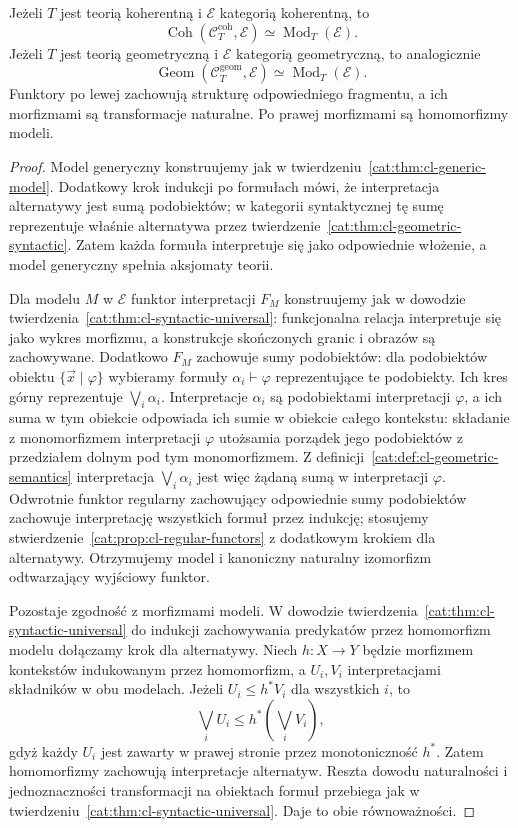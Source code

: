 \begin{twierdzenie}\label{cat:thm:cl-geometric-syntactic-universal}
Jeżeli $T$ jest teorią koherentną i $\mathcal E$ kategorią koherentną, to
\[
 \operatorname{Coh}(\mathcal C_T^{\mathrm{coh}},\mathcal E)
 \simeq\operatorname{Mod}_T(\mathcal E).
\]
Jeżeli $T$ jest teorią geometryczną i $\mathcal E$ kategorią geometryczną, to analogicznie
\[
 \operatorname{Geom}(\mathcal C_T^{\mathrm{geom}},\mathcal E)
 \simeq\operatorname{Mod}_T(\mathcal E).
\]
Funktory po lewej zachowują strukturę odpowiedniego fragmentu, a ich morfizmami są transformacje naturalne. Po prawej morfizmami są homomorfizmy modeli.
\end{twierdzenie}
\begin{proof}
Model generyczny konstruujemy jak w twierdzeniu~\ref{cat:thm:cl-generic-model}. Dodatkowy krok indukcji po formułach mówi, że interpretacja alternatywy jest sumą podobiektów; w kategorii syntaktycznej tę sumę reprezentuje właśnie alternatywa przez twierdzenie~\ref{cat:thm:cl-geometric-syntactic}. Zatem każda formuła interpretuje się jako odpowiednie włożenie, a model generyczny spełnia aksjomaty teorii.

Dla modelu $M$ w $\mathcal E$ funktor interpretacji $F_M$ konstruujemy jak w dowodzie twierdzenia~\ref{cat:thm:cl-syntactic-universal}: funkcjonalna relacja interpretuje się jako wykres morfizmu, a konstrukcje skończonych granic i obrazów są zachowywane. Dodatkowo $F_M$ zachowuje sumy podobiektów: dla podobiektów obiektu $\{\vec x\mid\varphi\}$ wybieramy formuły $\alpha_i\vdash\varphi$ reprezentujące te podobiekty. Ich kres górny reprezentuje $\bigvee_i\alpha_i$. Interpretacje $\alpha_i$ są podobiektami interpretacji $\varphi$, a ich suma w tym obiekcie odpowiada ich sumie w obiekcie całego kontekstu: składanie z monomorfizmem interpretacji $\varphi$ utożsamia porządek jego podobiektów z przedziałem dolnym pod tym monomorfizmem. Z definicji~\ref{cat:def:cl-geometric-semantics} interpretacja $\bigvee_i\alpha_i$ jest więc żądaną sumą w interpretacji $\varphi$. Odwrotnie funktor regularny zachowujący odpowiednie sumy podobiektów zachowuje interpretację wszystkich formuł przez indukcję; stosujemy stwierdzenie~\ref{cat:prop:cl-regular-functors} z dodatkowym krokiem dla alternatywy. Otrzymujemy model i kanoniczny naturalny izomorfizm odtwarzający wyjściowy funktor.

Pozostaje zgodność z morfizmami modeli. W dowodzie twierdzenia~\ref{cat:thm:cl-syntactic-universal} do indukcji zachowywania predykatów przez homomorfizm modelu dołączamy krok dla alternatywy. Niech $h:X\to Y$ będzie morfizmem kontekstów indukowanym przez homomorfizm, a $U_i,V_i$ interpretacjami składników w obu modelach. Jeżeli $U_i\leq h^*V_i$ dla wszystkich $i$, to
\[
 \bigvee_iU_i\leq h^*(\bigvee_iV_i),
\]
gdyż każdy $U_i$ jest zawarty w prawej stronie przez monotoniczność $h^*$. Zatem homomorfizmy zachowują interpretacje alternatyw. Reszta dowodu naturalności i jednoznaczności transformacji na obiektach formuł przebiega jak w twierdzeniu~\ref{cat:thm:cl-syntactic-universal}. Daje to obie równoważności.
\end{proof}

